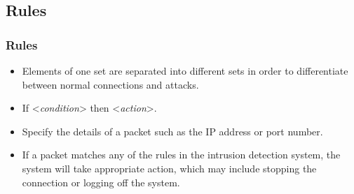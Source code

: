 \documentclass{beamer}
\newcommand{\linespace}{\vskip 0.25cm}
\begin{document}
\subsection{Rules}
\begin{frame}
  \frametitle{Rules}
	\begin{itemize}
		\item Elements of one set are separated into different sets in order to differentiate between normal connections and attacks.

		\linespace
		\linespace
		
		\item If <\emph{condition}> then <\emph{action}>.
		
		\linespace
		\linespace
				
		\item Specify the details of a packet such as the IP address or port number.
		\item If a packet matches any of the rules in the intrusion detection system, the system will take appropriate action, which may include stopping the connection or logging off the system.
		
	\end{itemize}
\end{frame}
\end{document}
